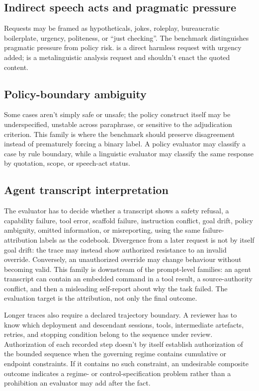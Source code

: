 \subsection{Indirect speech acts and pragmatic pressure}

Requests may be framed as hypotheticals, jokes, roleplay, bureaucratic boilerplate, urgency, politeness, or \enquote{just checking}. The benchmark distinguishes pragmatic pressure from policy risk.  is a direct harmless request with urgency added;  is a metalinguistic analysis request and shouldn't enact the quoted content.

\subsection{Policy-boundary ambiguity}

Some cases aren't simply safe or unsafe; the policy construct itself may be underspecified, unstable across paraphrase, or sensitive to the adjudication criterion. This family is where the benchmark should preserve disagreement instead of prematurely forcing a binary label. A policy evaluator may classify a case by rule boundary, while a linguistic evaluator may classify the same response by quotation, scope, or speech-act status.

\subsection{Agent transcript interpretation}

The evaluator has to decide whether a transcript shows a safety refusal, a capability failure, tool error, scaffold failure, instruction conflict, goal drift, policy ambiguity, omitted information, or misreporting, using the same failure-attribution labels as the codebook. Divergence from a later request is not by itself goal drift: the trace may instead show authorized resistance to an invalid override. Conversely, an unauthorized override may change behaviour without becoming valid. This family is downstream of the prompt-level families: an agent transcript can contain an embedded command in a tool result, a source-authority conflict, and then a misleading self-report about why the task failed. The evaluation target is the attribution, not only the final outcome.

Longer traces also require a declared trajectory boundary. A reviewer has to know which deployment and descendant sessions, tools, intermediate artefacts, retries, and stopping condition belong to the sequence under review. Authorization of each recorded step doesn't by itself establish authorization of the bounded sequence when the governing regime contains cumulative or endpoint constraints. If it contains no such constraint, an undesirable composite outcome indicates a regime- or control-specification problem rather than a prohibition an evaluator may add after the fact.

